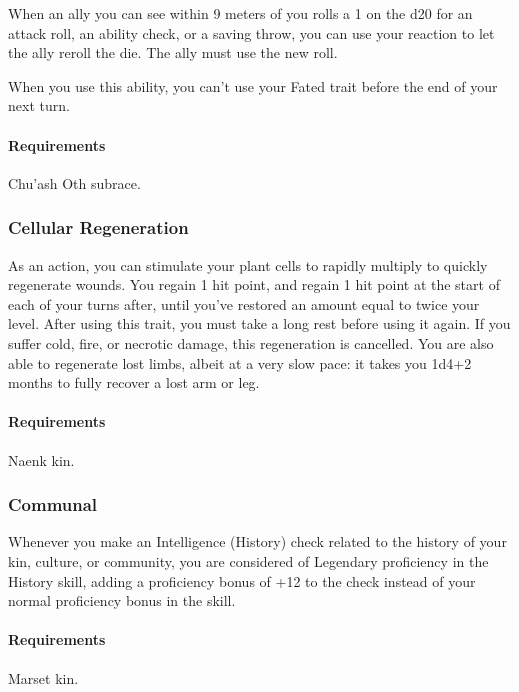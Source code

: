     When an ally you can see within 9 meters of you rolls a 1 on the d20 for an attack roll, an ability check, or a saving throw, you can use your reaction to let the ally reroll the die.
    The ally must use the new roll.

    When you use this ability, you can't use your Fated trait before the end of your next turn.
    \paragraph{Requirements} Chu'ash Oth subrace.
\subsubsection{Cellular Regeneration} \label{feat::cellularregeneration}
    As an action, you can stimulate your plant cells to rapidly multiply to quickly regenerate wounds.
    You regain 1 hit point, and regain 1 hit point at the start of each of your turns after, until you've restored an amount equal to twice your level.
    After using this trait, you must take a long rest before using it again.
    If you suffer cold, fire, or necrotic damage, this regeneration is cancelled.
    You are also able to regenerate lost limbs, albeit at a very slow pace: it takes you 1d4+2 months to fully recover a lost arm or leg.
    \paragraph{Requirements} Naenk kin.
\subsubsection{Communal} \label{feat::communal}
    Whenever you make an Intelligence (History) check related to the history of your kin, culture, or community, you are considered of Legendary proficiency in the History skill, adding a proficiency bonus of +12 to the check instead of your normal proficiency bonus in the skill.
    \paragraph{Requirements} Marset kin.
